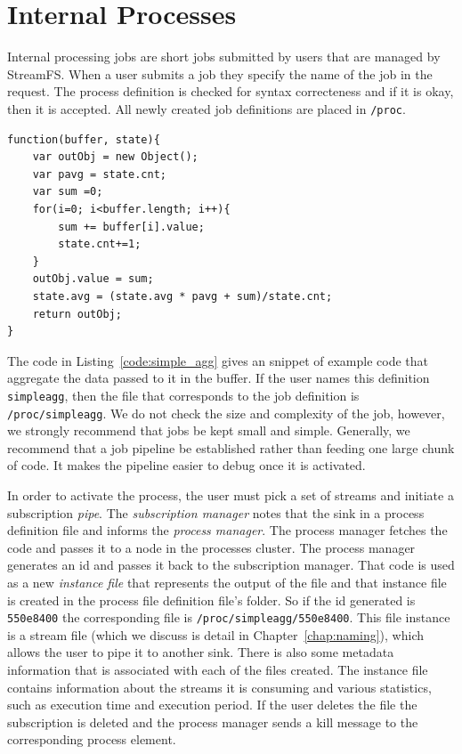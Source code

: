 \section{Internal Processes}
\label{sec:internalprocs}

Internal processing jobs are short jobs submitted by users that are managed by StreamFS.  When a user submits
a job they specify the name of the job in the request.  The process definition is checked for syntax correcteness
and if it is okay, then it is accepted.  All newly created job definitions are placed in \texttt{/proc}.


\begin{lstlisting}[caption={Simple aggregator process job.},label={code:simple_agg}]
function(buffer, state){ 
    var outObj = new Object();
    var pavg = state.cnt;
    var sum =0;
    for(i=0; i<buffer.length; i++){
        sum += buffer[i].value;
        state.cnt+=1;
    }
    outObj.value = sum;
    state.avg = (state.avg * pavg + sum)/state.cnt;
    return outObj;
}
\end{lstlisting}


The code in Listing~\ref{code:simple_agg} gives an snippet of example code that aggregate the data 
passed to it in the buffer.  If the user names this definition \texttt{simpleagg}, then the file that corresponds to 
the job definition is \texttt{/proc/simpleagg}.  We do not check the size and complexity of the job, however, we
strongly recommend that jobs be kept small and simple.  Generally, we recommend that a job pipeline 
be established rather than feeding one large chunk of code.  It makes the pipeline easier to debug once it is
activated.

In order to activate the process, the user must pick a set of streams and initiate a subscription \emph{pipe}.  The 
\emph{subscription manager} notes that the sink in a process definition file and informs the \emph{process manager}.
The process manager fetches the code and passes it to a node in the processes cluster.  The process manager
generates an id and passes it back to the subscription manager.  That code is used as a new \emph{instance file} that 
represents the output of the file and that instance file is created in the process file definition file's folder.
So if the id generated is \texttt{550e8400} the corresponding file is \texttt{/proc/simpleagg/550e8400}.
This file instance is a stream file (which we discuss is detail in Chapter~\ref{chap:naming}), which allows the user
to pipe it to another sink.  There is also some metadata information that is associated with each of the files created.
The instance file contains information about the streams it is consuming and various statistics, such as 
execution time and execution period.  If the user deletes the file the subscription is deleted and the process manager sends
a kill message to the corresponding process element.

